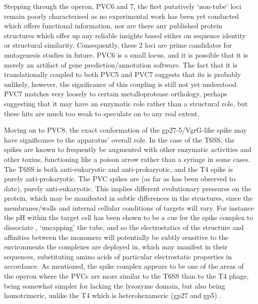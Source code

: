 Stepping through the operon, PVC6 and 7, the first putatively `non-tube' loci remain poorly characterised as no experimental work has been yet conducted which offers functional information, nor are there any published protein structures which offer up any reliable insights based either on sequence identity or structural similarity. Consequently, these 2 loci are prime candidates for mutagenesis studies in future. PVC6 is a small locus, and it is possible that it is merely an artifact of gene prediction/annotation software. The fact that it is translationally coupled to both PVC5 and PVC7 suggests that its is probably unlikely, however, the significance of this coupling is still not yet understood. PVC7 matches very loosely to certain metalloprotease orthology, perhaps suggesting that it may have an enzymatic role rather than a structural role, but these hits are much too weak to speculate on to any real extent.

Moving on to PVC8, the exact conformation of the gp27-5/VgrG-like spike may have significance to the apparatus' overall role. In the case of the T6SS, the spikes are known to frequently be augmented with other enzymatic activities and other toxins, functioning like a poison arrow rather than a syringe in some cases. The T6SS is both anti-eukaryotic and anti-prokaryotic, and the T4 spike is purely anti-prokaryotic. The PVC spikes are (as far as has been observed to date), purely anti-eukaryotic. This implies different evolutionary pressures on the protein, which may be manifested in subtle differences in the structures, since the membranes/walls and internal cellular conditions of targets will vary. For instance the pH within the target cell has been shown to be a cue for the spike complex to dissociate \citep{KumarSarkar2006}, `uncapping' the tube, and so the electrostatics of the structure and affinities between the monomers will potentially be subtly sensitive to the environments the complexes are deployed in, which may manifest in their sequences, substituting amino acids of particular electrostatic properties in accordance. As mentioned, the spike complex appears to be one of the areas of the operon where the PVCs are more similar to the T6SS than to the T4 phage, being somewhat simpler for lacking the lysozyme domain, but also being homotrimeric, unlike the T4 which is heterohexameric (gp27 and gp5) \citep{KumarSarkar2006, Arisaka2003}.

